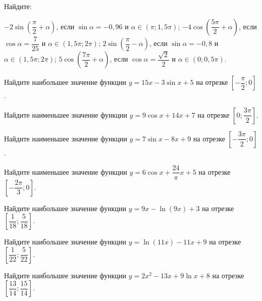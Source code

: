 \begin{homework}[number=2]
	\begin{listofex}
		\item Найдите:
		\begin{tasks}
			\task \( -2 \sin \left( \dfrac{ \pi }{ 2 }+\alpha \right) \), если \( \sin \alpha = -0,96 \) и \( \alpha \in (\pi;1,5\pi) \);
			\task \( -4 \cos \left( \dfrac{ 5\pi }{ 2 }+ \alpha \right) \), если \( \cos \alpha = \dfrac{ 7 }{ 25 } \) и \( \alpha \in (1,5\pi; 2\pi) \);
			\task \( 2\sin \left( \dfrac{ \pi }{ 2 }- \alpha \right) \), если \( \sin \alpha = -0,8 \) и \( \alpha \in (1,5\pi;2\pi) \);
			\task \( 5 \cos \left( \dfrac{ 7\pi }{ 2 } + \alpha \right) \), если \( \cos \alpha = \dfrac{ \sqrt{2} }{ 2 } \) и \( \alpha \in (0;0,5\pi) \).
		\end{tasks}
		\item Найдите наибольшее значение функции \( y=15x-3\sin x+5 \) на отрезке \(\left[ -\dfrac{ \pi }{ 2 };0 \right] \).
		\item Найдите наименьшее значение функции \( y=9\cos x +14x +7 \) на отрезке \(\left[ 0;\dfrac{ 3\pi }{ 2 } \right] \).
		\item Найдите наименьшее значение функции \( y=7 \sin x -8x +9 \) на отрезке \(\left[ -\dfrac{ 3\pi }{ 2 };0 \right] \).
		\item Найдите наименьшее значение функции \( y=6 \cos x + \dfrac{ 24 }{ \pi }x+5 \) на отрезке \(\left[ -\dfrac{ 2\pi }{ 3 };0 \right] \).
		\item Найдите наибольшее значение функции \( y=9x-\ln(9x)+3 \) на отрезке \(\left[ \dfrac{ 1 }{ 18 };\dfrac{ 5 }{ 18 } \right] \).
		\item Найдите наибольшее значение функции \( y=\ln(11x)-11x+9 \) на отрезке \(\left[ \dfrac{ 1 }{ 22 };\dfrac{5  }{22  } \right] \).
		\item Найдите наибольшее значение функции \( y=2x^2-13x+9 \ln x +8 \) на отрезке \(\left[ \dfrac{ 13 }{ 14 }; \dfrac{  15}{ 14 } \right] \).

\end{listofex}
\end{homework}
